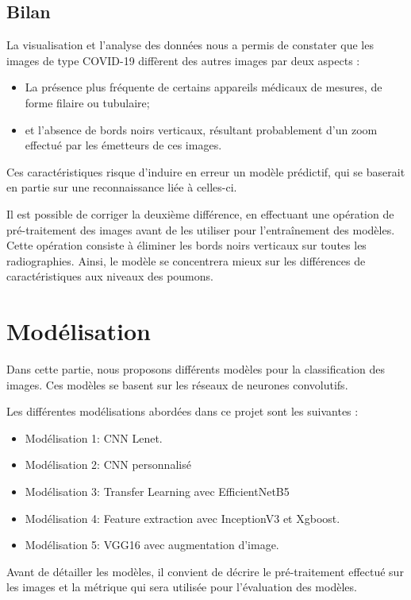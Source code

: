 \documentclass[11pt,twoside,openright]{article}
\begin{document}
\subsection{Bilan}

La visualisation et l'analyse des données nous a permis de constater que les images de type COVID-19 diffèrent des autres images par deux aspects : 
\begin{itemize}
    \item La présence plus fréquente de certains appareils médicaux de mesures, de forme filaire ou tubulaire;
    \item et l'absence de bords noirs verticaux, résultant probablement d'un zoom effectué par les émetteurs de ces images.
\end{itemize}

Ces caractéristiques risque d'induire en erreur un modèle prédictif, qui se baserait en partie sur une reconnaissance liée à celles-ci.

Il est possible de corriger la deuxième différence, en effectuant une opération de pré-traitement des images avant de les utiliser pour l'entraînement des modèles. Cette opération consiste à éliminer les bords noirs verticaux sur toutes les radiographies. Ainsi, le modèle se concentrera mieux sur les différences de caractéristiques aux niveaux des poumons.

\section{Modélisation}

Dans cette partie, nous proposons différents modèles pour la classification des images. Ces modèles se basent sur les réseaux de neurones convolutifs.

Les différentes modélisations abordées dans ce projet sont les suivantes :
\begin{itemize}
\item Modélisation 1: CNN Lenet.
\item Modélisation 2: CNN personnalisé
\item Modélisation 3: Transfer Learning avec EfficientNetB5
\item Modélisation 4: Feature extraction avec InceptionV3 et Xgboost.
\item Modélisation 5: VGG16 avec augmentation d'image.
\end{itemize}

Avant de détailler les modèles, il convient de décrire le pré-traitement effectué sur les images et la métrique qui sera utilisée pour l'évaluation des modèles.
\end{document}
